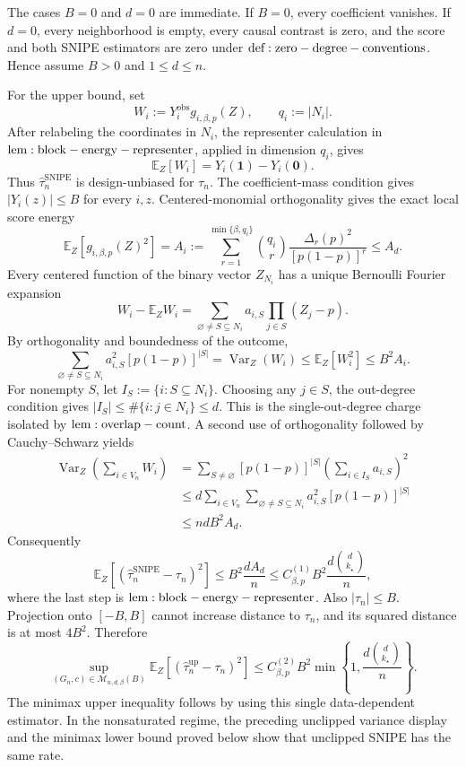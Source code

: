 The cases \(B=0\) and \(d=0\) are immediate. If \(B=0\), every coefficient vanishes. If \(d=0\), every neighborhood is empty, every causal contrast is zero, and the score and both SNIPE estimators are zero under \({\rm def:zero-degree-conventions}\). Hence assume \(B>0\) and \(1\le d\le n\).

For the upper bound, set
\[
W_i:=Y_i^{\mathrm{obs}}g_{i,\beta,p}(Z),\qquad q_i:=|N_i|.
\]
After relabeling the coordinates in \(N_i\), the representer calculation in \({\rm lem:block-energy-representer}\), applied in dimension \(q_i\), gives
\[
\mathbb E_Z[W_i]=Y_i(\mathbf1)-Y_i(\mathbf0).
\]
Thus \(\widehat\tau_n^{\mathrm{SNIPE}}\) is design-unbiased for \(\tau_n\). The coefficient-mass condition gives \(|Y_i(z)|\le B\) for every \(i,z\). Centered-monomial orthogonality gives the exact local score energy
\[
\mathbb E_Z[g_{i,\beta,p}(Z)^2]
=A_i:=\sum_{r=1}^{\min\{\beta,q_i\}}\binom{q_i}{r}\frac{\Delta_r(p)^2}{[p(1-p)]^r}\le A_d.
\]
Every centered function of the binary vector \(Z_{N_i}\) has a unique Bernoulli Fourier expansion
\[
W_i-\mathbb E_ZW_i=\sum_{\varnothing\ne S\subseteq N_i}a_{i,S}\prod_{j\in S}(Z_j-p).
\]
By orthogonality and boundedness of the outcome,
\[
\sum_{\varnothing\ne S\subseteq N_i}a_{i,S}^2[p(1-p)]^{|S|}
=\operatorname{Var}_Z(W_i)
\le\mathbb E_Z[W_i^2]
\le B^2A_i.
\]
For nonempty \(S\), let \(I_S:=\{i:S\subseteq N_i\}\). Choosing any \(j\in S\), the out-degree condition gives \(|I_S|\le\#\{i:j\in N_i\}\le d\). This is the single-out-degree charge isolated by \({\rm lem:overlap-count}\). A second use of orthogonality followed by Cauchy--Schwarz yields
\[
\begin{aligned}
\operatorname{Var}_Z\!\left(\sum_{i\in V_n}W_i\right)
&=\sum_{S\ne\varnothing}[p(1-p)]^{|S|}\left(\sum_{i\in I_S}a_{i,S}\right)^2\\
&\le d\sum_{i\in V_n}\sum_{\varnothing\ne S\subseteq N_i}a_{i,S}^2[p(1-p)]^{|S|}\\
&\le ndB^2A_d.
\end{aligned}
\]
Consequently
\[
\mathbb E_Z[(\widehat\tau_n^{\mathrm{SNIPE}}-\tau_n)^2]
\le B^2\frac{dA_d}{n}
\le C_{\beta,p}^{(1)}B^2\frac{d\binom d{k_\star}}{n},
\]
where the last step is \({\rm lem:block-energy-representer}\). Also \(|\tau_n|\le B\). Projection onto \([-B,B]\) cannot increase distance to \(\tau_n\), and its squared distance is at most \(4B^2\). Therefore
\[
\sup_{(G_n,c)\in\mathcal M_{n,d,\beta}(B)}
\mathbb E_Z[(\widehat\tau_n^{\mathrm{up}}-\tau_n)^2]
\le C_{\beta,p}^{(2)}B^2\min\!\left\{1,\frac{d\binom d{k_\star}}{n}\right\}.
\]
The minimax upper inequality follows by using this single data-dependent estimator. In the nonsaturated regime, the preceding unclipped variance display and the minimax lower bound proved below show that unclipped SNIPE has the same rate.

